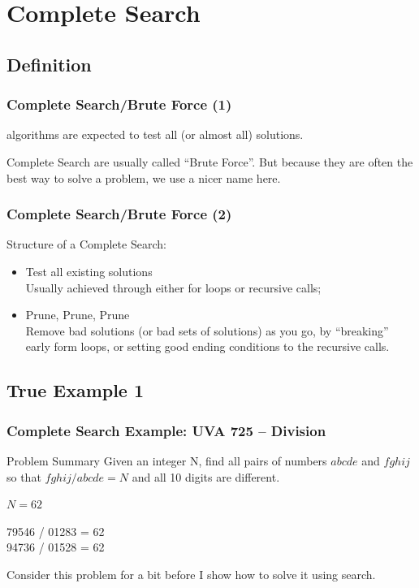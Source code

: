 \documentclass{beamer}
\begin{document}
\section{Complete Search}
\subsection{Definition}
\begin{frame}
  \frametitle{Complete Search/Brute Force (1)}

   algorithms are expected to test all (or
  almost all) solutions.

  \bigskip

  \begin{exampleblock}{}
  Complete Search are usually called ``Brute Force''. But because they
  are often the best way to solve a problem, we use a nicer name here.
  \end{exampleblock}
\end{frame}


\begin{frame}
  \frametitle{Complete Search/Brute Force (2)}

  Structure of a Complete Search:

  \bigskip

  \begin{itemize}
  \item Test all existing solutions\\
    Usually achieved through either for loops or recursive calls;

    \bigskip

  \item Prune, Prune, Prune\\
    Remove bad solutions (or bad sets of solutions) as you go, by 
    ``breaking'' early form loops, or setting good ending conditions 
    to the recursive calls.
  \end{itemize}
  
\end{frame}

\subsection{True Example 1}
\begin{frame}
  \frametitle{Complete Search Example: UVA 725 -- Division}
  \begin{block}{Problem Summary}
    Given an integer N, find all pairs of numbers $abcde$ and $fghij$ so that 
    $fghij/abcde = N$ and all 10 digits are different.

    \bigskip

     $N = 62$

    \medskip

    79546 / 01283 = 62\\
    94736 / 01528 = 62\\
  \end{block}

  \vfill
  
  Consider this problem for a bit before I show how to solve it using search.
\end{frame}
\end{document}

